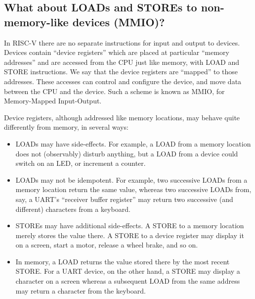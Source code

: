 
\subsection{What about LOADs and STOREs to non-memory-like devices (MMIO)?}

\label{Sec_DMem_MMIO}


In RISC-V there are no separate instructions for input and output to
devices.  Devices contain ``device registers'' which are placed at
particular ``memory addresses'' and are accessed from the CPU just
like memory, with LOAD and STORE instructions.  We say that the device
registers are ``mapped'' to those addresses.  These accesses can
control and configure the device, and move data between the CPU and
the device.  Such a scheme is known as MMIO, for Memory-Mapped
Input-Output.

Device registers, although addressed like memory locations, may behave
quite differently from memory, in several ways:

\begin{itemize}

  \item LOADs may have side-effects.  For example, a LOAD from a
    memory location does not (observably) disturb anything, but a LOAD
    from a device could switch on an LED, or increment a counter.

  \item LOADs may not be idempotent.  For example, two successive
    LOADs from a memory location return the same value, whereas two
    successive LOADs from, say, a UART's ``receiver buffer register''
    may return two successive (and different) characters from a
    keyboard.

  \item STOREs may have additional side-effects.  A STORE to a memory
    location merely stores the value there.  A STORE to a device
    register may display it on a screen, start a motor, release a
    wheel brake, and so on.

  \item In memory, a LOAD returns the value stored there by the most
    recent STORE.  For a UART device, on the other hand, a STORE may
    display a character on a screen whereas a subsequent LOAD from the
    same address may return a character from the keyboard.

\end{itemize}

